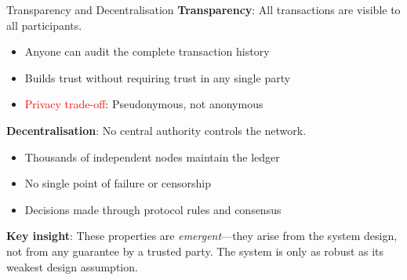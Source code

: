 \documentclass[10pt]{beamer}
\newcommand{\bad}[1]{\textcolor{red}{#1}}
\begin{document}
\begin{frame}{Transparency and Decentralisation}
  \textbf{Transparency}: All transactions are visible to all participants.
  
  \begin{itemize}
    \item Anyone can audit the complete transaction history
    \item Builds trust without requiring trust in any single party
    \item \bad{Privacy trade-off}: Pseudonymous, not anonymous
  \end{itemize}
  
  \vspace{1em}
  \textbf{Decentralisation}: No central authority controls the network.
  
  \begin{itemize}
    \item Thousands of independent nodes maintain the ledger
    \item No single point of failure or censorship
    \item Decisions made through protocol rules and consensus
  \end{itemize}
  
  \vspace{1em}
  \textbf{Key insight}: These properties are \textit{emergent}---they arise from the system design, not from any guarantee by a trusted party. The system is only as robust as its weakest design assumption.
\end{frame}
\end{document}
